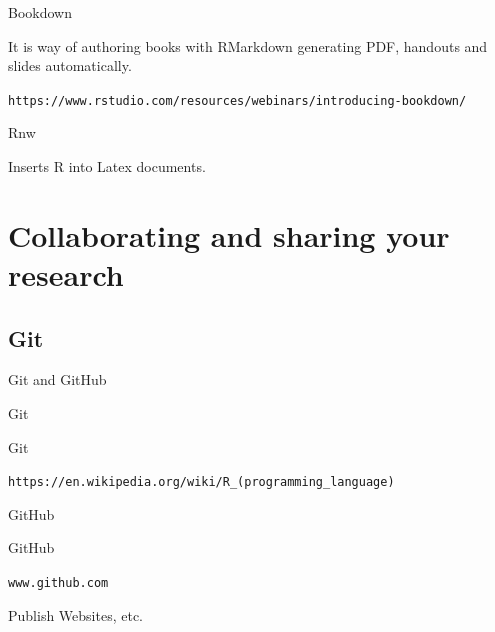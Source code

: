 \documentclass{beamer}
\begin{document}


\begin{frame}{Bookdown} %

It is way of authoring books with RMarkdown generating PDF, handouts and slides automatically.

\texttt{https://www.rstudio.com/resources/webinars/introducing-bookdown/}

\end{frame}



\begin{frame}{Rnw} %

Inserts R into Latex documents.

\end{frame}


\section[Collaborating and sharing]{Collaborating and sharing your research}


\subsection{Git}{Git and GitHub}


\begin{frame}{Git} %

Git 

\texttt{https://en.wikipedia.org/wiki/R\_(programming\_language)}
\end{frame}


\begin{frame}{GitHub} %

GitHub 

\texttt{www.github.com}

Publish Websites, etc.

\end{frame}
\end{document}
